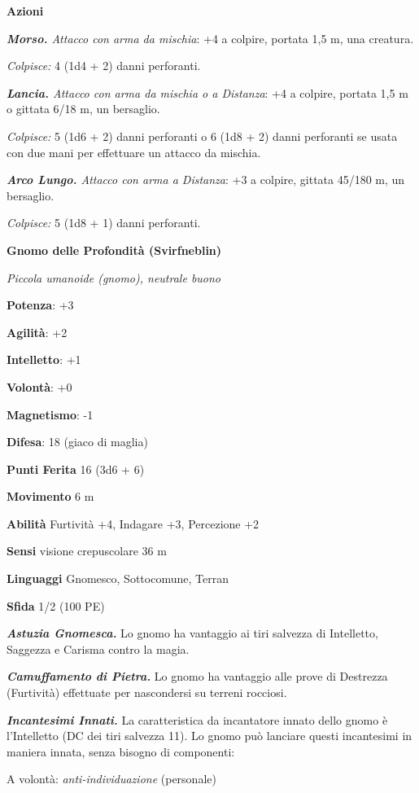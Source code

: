 \begin{multicols}{2}
\textbf{Azioni}

\emph{\textbf{Morso.} Attacco con arma da mischia}: +4 a colpire,
portata 1,5 m, una creatura.

\emph{Colpisce:} 4 (1d4 + 2) danni perforanti.

\emph{\textbf{Lancia.} Attacco con arma da mischia o a Distanza}: +4 a
colpire, portata 1,5 m o gittata 6/18 m, un bersaglio.

\emph{Colpisce:} 5 (1d6 + 2) danni perforanti o 6 (1d8 + 2) danni
perforanti se usata con due mani per effettuare un attacco da mischia.

\emph{\textbf{Arco Lungo.} Attacco con arma a Distanza}: +3 a colpire,
gittata 45/180 m, un bersaglio.

\emph{Colpisce:} 5 (1d8 + 1) danni perforanti.

\textbf{Gnomo delle Profondità (Svirfneblin)}

\emph{Piccola umanoide (gnomo), neutrale buono}

\textbf{Potenza}: +3

\textbf{Agilità}: +2

\textbf{Intelletto}: +1

\textbf{Volontà}: +0

\textbf{Magnetismo}: -1

\textbf{Difesa}: 18 (giaco di maglia)

\textbf{Punti Ferita} 16 (3d6 + 6)

\textbf{Movimento} 6 m

\textbf{Abilità} Furtività +4, Indagare +3, Percezione +2

\textbf{Sensi} visione crepuscolare 36 m

\textbf{Linguaggi} Gnomesco, Sottocomune, Terran

\textbf{Sfida} 1/2 (100 PE)

\emph{\textbf{Astuzia Gnomesca.}} Lo gnomo ha vantaggio ai tiri salvezza
di Intelletto, Saggezza e Carisma contro la magia.

\emph{\textbf{Camuffamento di Pietra.}} Lo gnomo ha vantaggio alle prove
di Destrezza (Furtività) effettuate per nascondersi su terreni rocciosi.

\emph{\textbf{Incantesimi Innati.}} La caratteristica da incantatore
innato dello gnomo è l'Intelletto (DC dei tiri salvezza 11). Lo gnomo
può lanciare questi incantesimi in maniera innata, senza bisogno di
componenti:

A volontà: \emph{anti-individuazione} (personale)


\end{multicols}
